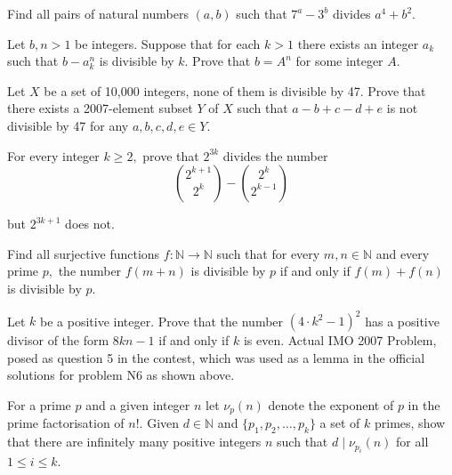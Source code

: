 \item[\textbf{N1.}]
Find all pairs of natural numbers 
$ (a, b)$
 such that 
$ 7^a - 3^b$
 divides 
$ a^4 + b^2$.

\item[\textbf{N2.}]
Let 
$b,n > 1$
 be integers. Suppose that for each 
$k > 1$
 there exists an integer 
$a_k$
 such that 
$b - a^n_k$
 is divisible by 
$k$.
 Prove that 
$b = A^n$
 for some integer 
$A$.

\item[\textbf{N3.}]
Let 
$ X$
 be a set of 10,000 integers, none of them is divisible by 47. Prove that there exists a 2007-element subset 
$ Y$
 of 
$ X$
 such that 
$ a - b + c - d + e$
 is not divisible by 47 for any 
$ a,b,c,d,e \in Y.$

\item[\textbf{N4.}]
For every integer 
$ k \geq 2,$
 prove that 
$ 2^{3k}$
 divides the number
\[ \binom{2^{k + 1}}{2^{k}} - \binom{2^{k}}{2^{k - 1}}
\]


but 
$ 2^{3k + 1}$
 does not.

\item[\textbf{N5.}]
Find all surjective functions 
$ f: \mathbb{N} \to \mathbb{N}$
 such that for every 
$ m,n \in \mathbb{N}$
 and every prime 
$ p,$
 the number 
$ f(m + n)$
 is divisible by 
$ p$
 if and only if 
$ f(m) + f(n)$
 is divisible by 
$ p$.

\item[\textbf{N6.}]
Let 
$ k$
 be a positive integer. Prove that the number 
$ (4 \cdot k^2 - 1)^2$
 has a positive divisor of the form 
$ 8kn - 1$
 if and only if 
$ k$
 is even.
Actual IMO 2007 Problem, posed as question 5 in the contest, which was used as a lemma in the official solutions for problem N6 as shown above.

\item[\textbf{N7.}]
For a prime 
$ p$
 and a given integer 
$ n$
 let 
$ \nu_p(n)$
 denote the exponent of 
$ p$
 in the prime factorisation of 
$ n!$.
 Given 
$ d \in \mathbb{N}$
 and 
$ \{p_1,p_2,\ldots,p_k\}$
 a set of 
$ k$
 primes, show that there are infinitely many positive integers 
$ n$
 such that 
$ d\mid \nu_{p_i}(n)$
 for all 
$ 1 \leq i \leq k$.
